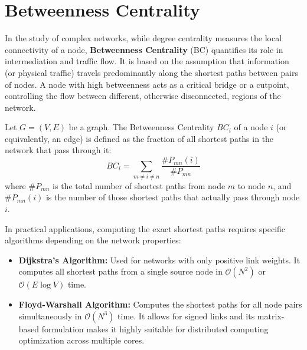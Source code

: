 \section{Betweenness Centrality}

In the study of complex networks, while degree centrality measures the local connectivity of a node, \textbf{Betweenness Centrality} (BC) quantifies its role in intermediation and traffic flow. It is based on the assumption that information (or physical traffic) travels predominantly along the shortest paths between pairs of nodes. A node with high betweenness acts as a critical bridge or a cutpoint, controlling the flow between different, otherwise disconnected, regions of the network.

\begin{definition}
    Let $G = (V, E)$ be a graph. The Betweenness Centrality $BC_i$ of a node $i$ (or equivalently, an edge) is defined as the fraction of all shortest paths in the network that pass through it:
    \[ BC_i = \sum_{m \neq i \neq n} \frac{\#P_{mn}(i)}{\#P_{mn}} \]
    where $\#P_{mn}$ is the total number of shortest paths from node $m$ to node $n$, and $\#P_{mn}(i)$ is the number of those shortest paths that actually pass through node $i$.
\end{definition}

In practical applications, computing the exact shortest paths requires specific algorithms depending on the network properties:
\begin{itemize}
    \item \textbf{Dijkstra's Algorithm:} Used for networks with only positive link weights. It computes all shortest paths from a single source node in $\mathcal{O}(N^2)$ or $\mathcal{O}(E \log V)$ time.
    \item \textbf{Floyd-Warshall Algorithm:} Computes the shortest paths for all node pairs simultaneously in $\mathcal{O}(N^3)$ time. It allows for signed links and its matrix-based formulation makes it highly suitable for distributed computing optimization across multiple cores.
\end{itemize}


